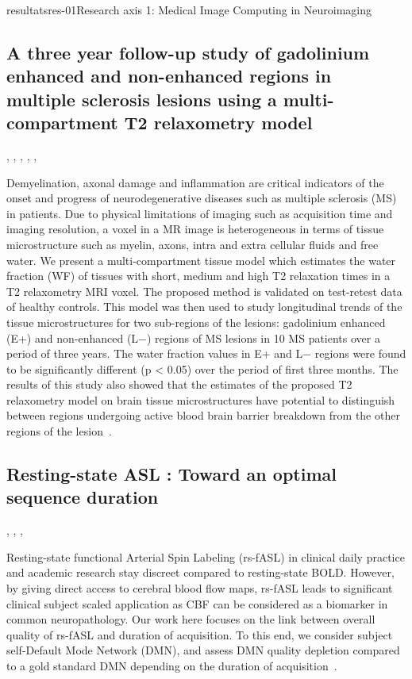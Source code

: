 \documentclass{ra2018}
\begin{document}
\begin{module}{resultats}{res-01}{Research axis 1: Medical Image Computing in Neuroimaging}
\subsection{A three year follow-up study of gadolinium enhanced and non-enhanced regions in multiple sclerosis lesions using a multi-compartment T2 relaxometry model}
\begin{participants}
      , 
      ,
      ,
      ,
      ,
\end{participants}
Demyelination, axonal damage and inflammation are critical indicators of the onset and progress of neurodegenerative diseases such as multiple sclerosis (MS) in patients. Due to physical limitations of imaging such as acquisition time and imaging resolution, a voxel in a MR image is heterogeneous in terms of tissue microstructure such as myelin, axons, intra and extra cellular fluids and free water. We present a multi-compartment tissue model which estimates the water fraction (WF) of tissues with short, medium and high T2 relaxation times in a T2 relaxometry MRI voxel. The proposed method is validated on test-retest data of healthy controls. This model was then used to study longitudinal trends of the tissue microstructures for two sub-regions of the lesions: gadolinium enhanced (E+) and non-enhanced (L−) regions of MS lesions in 10 MS patients over a period of three years. The water fraction values in E+ and L− regions were found to be significantly different (p < 0.05) over the period of first three months. The results of this study also showed that the estimates of the proposed T2 relaxometry model on brain tissue microstructures have potential to distinguish between regions undergoing active blood brain barrier breakdown from the other regions of the lesion~\cite{chatterjee:hal-01837974}.

\subsection{Resting-state ASL : Toward an optimal sequence duration}
\begin{participants}
      , 
      ,
      ,
\end{participants}
Resting-state functional Arterial Spin Labeling (rs-fASL) in clinical daily practice and academic research stay discreet compared to resting-state BOLD. However, by giving direct access to cerebral blood flow maps, rs-fASL leads to significant clinical subject scaled application as CBF can be considered as a biomarker in common neuropathology. Our work here focuses on the link between overall quality of rs-fASL and duration of acquisition. To this end, we consider subject self-Default Mode Network (DMN), and assess DMN quality depletion compared to a gold standard DMN depending on the duration of acquisition~\cite{vallee:inserm-01935089}.



\end{module}
\end{document}
